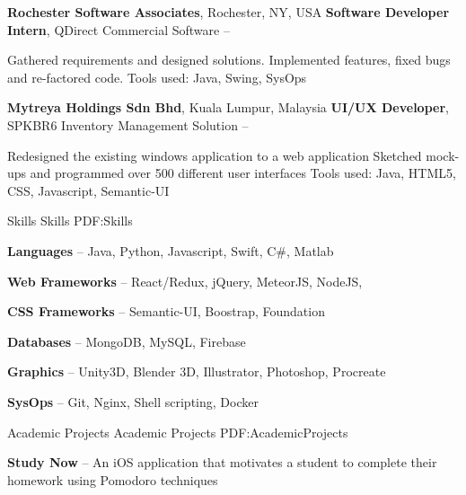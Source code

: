 \documentclass[letterpaper,MMMyyyy,nonstopmode]{simpleresumecv}
\begin{document}
\begin{Body}
\BigGap

\Entry
{\textbf{Rochester Software Associates}, \small{Rochester, NY, USA}}
\Gap
\BulletItem
\textbf{Software Developer Intern}, QDirect Commercial Software
\hfill
{} --
\begin{Detail}
\SubBulletItem
Gathered requirements and designed solutions.
\SubBulletItem
Implemented features, fixed bugs and re-factored code.
\SubBulletItem
Tools used: Java, Swing, SysOps
\end{Detail}


\BigGap

\Entry
{\textbf{Mytreya Holdings Sdn Bhd}, \small{Kuala Lumpur, Malaysia}}
\Gap
\BulletItem
\textbf{UI/UX Developer}, SPKBR6 Inventory Management Solution
\hfill
{} --
\begin{Detail}
\SubBulletItem
Redesigned the existing windows application to a web application
\SubBulletItem
Sketched mock-ups and programmed over 500 different user interfaces
\SubBulletItem
Tools used: Java, HTML5, CSS, Javascript, Semantic-UI
\end{Detail}




\Section
{Skills}
{Skills}
{PDF:Skills}

\BulletItem
\textbf{Languages} -- Java, Python, Javascript, Swift, C\#, Matlab
\Gap

\BulletItem
\textbf{Web Frameworks} -- React/Redux, jQuery, MeteorJS, NodeJS, 
\Gap

\BulletItem
\textbf{CSS Frameworks} -- Semantic-UI, Boostrap, Foundation
\Gap

\BulletItem
\textbf{Databases} -- MongoDB, MySQL, Firebase
\Gap

\BulletItem
\textbf{Graphics} -- Unity3D, Blender 3D, Illustrator, Photoshop, Procreate
\Gap

\BulletItem
\textbf{SysOps} -- Git, Nginx, Shell scripting, Docker
\Gap







\Section
{Academic \newline
Projects}
{Academic Projects}
{PDF:AcademicProjects}

\BulletItem
\textbf{Study Now} -- An iOS application that motivates a student to complete their homework using Pomodoro techniques


\end{Body}
\end{document}
